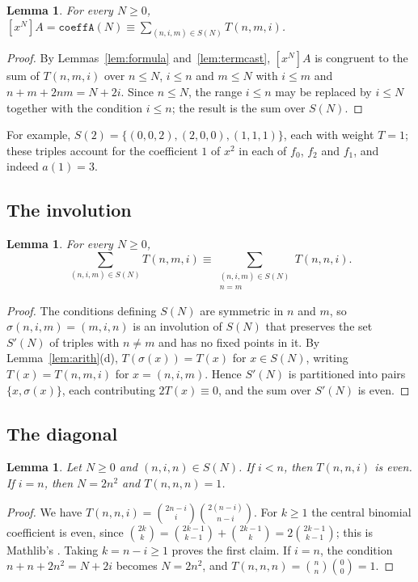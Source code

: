 \documentclass[11pt]{amsart}
\theoremstyle{plain}
\newtheorem{lemma}[theorem]{Lemma}
\theoremstyle{definition}
\newcommand{\co}[1]{[x^{#1}]}
\begin{document}
\begin{lemma}\label{lem:coeffcast}
For every $N\ge0$, $\displaystyle \co NA=\texttt{coeffA}(N)\equiv\sum_{(n,i,m)\in S(N)}T(n,m,i)$.
\end{lemma}

\begin{proof}
By Lemmas~\ref{lem:formula} and~\ref{lem:termcast}, $\co NA$ is congruent to the sum of $T(n,m,i)$ over $n\le N$, $i\le n$ and $m\le N$ with $i\le m$ and $n+m+2nm=N+2i$. Since $n\le N$, the range $i\le n$ may be replaced by $i\le N$ together with the condition $i\le n$; the result is the sum over $S(N)$.
\end{proof}

For example, $S(2)=\{(0,0,2),(2,0,0),(1,1,1)\}$, each with weight $T=1$; these triples account for the coefficient $1$ of $x^2$ in each of $f_0$, $f_2$ and $f_1$, and indeed $a(1)=3$.

\subsection{The involution}
\begin{lemma}\label{lem:involution}
For every $N\ge0$,
\[
  \sum_{(n,i,m)\in S(N)}T(n,m,i)\equiv\sum_{\substack{(n,i,m)\in S(N)\\ n=m}}T(n,n,i).
\]
\end{lemma}

\begin{proof}
The conditions defining $S(N)$ are symmetric in $n$ and $m$, so $\sigma(n,i,m)=(m,i,n)$ is an involution of $S(N)$ that preserves the set $S'(N)$ of triples with $n\ne m$ and has no fixed points in it. By Lemma~\ref{lem:arith}(d), $T(\sigma(x))=T(x)$ for $x\in S(N)$, writing $T(x)=T(n,m,i)$ for $x=(n,i,m)$. Hence $S'(N)$ is partitioned into pairs $\{x,\sigma(x)\}$, each contributing $2T(x)\equiv0$, and the sum over $S'(N)$ is even.
\end{proof}

\subsection{The diagonal}
\begin{lemma}\label{lem:diag}
Let $N\ge0$ and $(n,i,n)\in S(N)$. If $i<n$, then $T(n,n,i)$ is even. If $i=n$, then $N=2n^2$ and $T(n,n,n)=1$.
\end{lemma}

\begin{proof}
We have $T(n,n,i)=\binom{2n-i}{i}\binom{2(n-i)}{n-i}$. For $k\ge1$ the central binomial coefficient is even, since $\binom{2k}{k}=\binom{2k-1}{k-1}+\binom{2k-1}{k}=2\binom{2k-1}{k-1}$; this is Mathlib's . Taking $k=n-i\ge1$ proves the first claim. If $i=n$, the condition $n+n+2n^2=N+2i$ becomes $N=2n^2$, and $T(n,n,n)=\binom nn\binom00=1$.
\end{proof}
\end{document}
